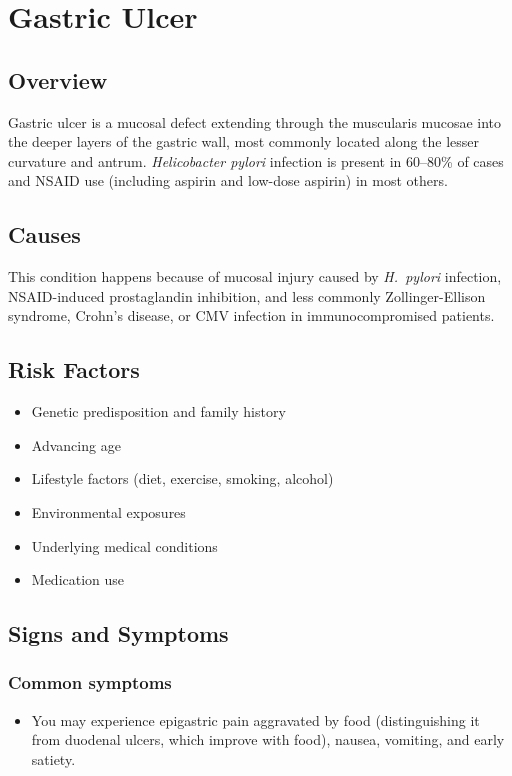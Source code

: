 \chapter{Gastric Ulcer}
\label{sec:Gastric Ulcer}

\section{Overview}
Gastric ulcer is a mucosal defect extending through the muscularis mucosae into the deeper layers of the gastric wall, most commonly located along the lesser curvature and antrum. \textit{Helicobacter pylori} infection is present in 60--80\% of cases and NSAID use (including aspirin and low-dose aspirin) in most others.
\section{Causes}
This condition happens because of mucosal injury caused by \textit{H.~pylori} infection, NSAID-induced prostaglandin inhibition, and less commonly Zollinger-Ellison syndrome, Crohn's disease, or CMV infection in immunocompromised patients.     
\section{Risk Factors}

\begin{itemize}[noitemsep]
  \item Genetic predisposition and family history
  \item Advancing age
  \item Lifestyle factors (diet, exercise, smoking, alcohol)
  \item Environmental exposures
  \item Underlying medical conditions
  \item Medication use
\end{itemize}
\section{Signs and Symptoms}

\subsection{Common symptoms}
\begin{itemize}[noitemsep]
  \item You may experience epigastric pain aggravated by food (distinguishing it from duodenal ulcers, which improve with food), nausea, vomiting, and early satiety. 
  \end{itemize}

